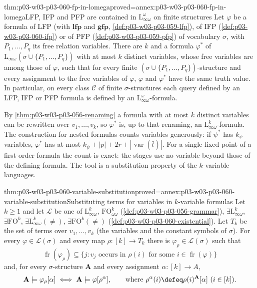 \begin{hbtheorem}{thm:p03-w03-p03-060-fp-in-lomega}{proved=annex:p03-w03-p03-060-fp-in-lomega}{LFP, IFP and PFP are contained in \(\mathrm{L}^\omega_{\infty\omega}\) on finite structures}
Let \(\varphi\) be a formula of LFP (with \(\mathbf{lfp}\) and
\(\mathbf{gfp}\), \cref{def:p03-w03-p03-059-lfp}), of IFP
(\cref{def:p03-w03-p03-060-ifp}) or of PFP (\cref{def:p03-w03-p03-059-pfp})
of vocabulary \(\sigma\), with \(P_1,\ldots,P_q\) its free relation
variables. There are \(k\) and a formula \(\varphi^\ast\) of
\(\mathrm{L}_{\infty\omega}(\sigma\cup\{P_1,\ldots,P_q\})\) with at most
\(k\) distinct variables, whose free variables are among those of
\(\varphi\), such that for every finite
\((\sigma\cup\{P_1,\ldots,P_q\})\)-structure and every assignment to the
free variables of \(\varphi\), \(\varphi\) and \(\varphi^\ast\) have the
same truth value. In particular, on every class \(\mathcal C\) of finite
\(\sigma\)-structures each query defined by an LFP, IFP or PFP formula is
defined by an \(\mathrm{L}^\omega_{\infty\omega}\)-formula.
\end{hbtheorem}

By \cref{thm:p03-w03-p03-056-renaming} a formula with at most \(k\) distinct
variables can be rewritten over \(v_1,\ldots,v_k\), so \(\varphi^\ast\) is,
up to that renaming, an \(\mathrm{L}^k_{\infty\omega}\)-formula. The
construction for nested formulas counts variables generously: if
\(\psi^\ast\) has \(k_\psi\) variables, \(\varphi^\ast\) has at most
\(k_\psi+|\bar p|+2r+|\operatorname{var}(\bar t)|\). For a single fixed
point of a first-order formula the count is exact: the stages use no
variable beyond those of the defining formula. The tool is a substitution
property of the \(k\)-variable languages.

\begin{hblemma}{thm:p03-w03-p03-060-variable-substitution}{proved=annex:p03-w03-p03-060-variable-substitution}{Substituting terms for variables in \(k\)-variable formulas}
Let \(k\ge1\) and let \(\mathcal L\) be one of
\(\mathrm{L}^k_{\infty\omega}\), \(\mathrm{FO}^k_{\omega\omega}\)
(\cref{def:p03-w03-p03-056-grammar}), \(\exists\mathrm{L}^k_{\infty\omega}\),
\(\exists\mathrm{FO}^k\), \(\exists\mathrm{L}^k_{\infty\omega}(\neq)\),
\(\exists\mathrm{FO}^k(\neq)\) (\cref{def:p03-w03-p03-060-existential}).
Let \(T_k\) be the set of terms over \(v_1,\ldots,v_k\) (the variables and
the constant symbols of \(\sigma\)). For every \(\varphi\in\mathcal L(\sigma)\)
and every map \(\rho\colon[k]\to T_k\) there is
\(\varphi_\rho\in\mathcal L(\sigma)\) such that
\[
 \operatorname{fr}(\varphi_\rho)\subseteq\{j:v_j\text{ occurs in }\rho(i)\text{ for some }i\in\operatorname{fr}(\varphi)\}
\]
and, for every \(\sigma\)-structure \(\mathbf A\) and every assignment
\(\alpha\colon[k]\to A\),
\[
 \mathbf A\models\varphi_\rho[\alpha]\iff\mathbf A\models\varphi[\rho^\alpha],
 \qquad\text{where }\rho^\alpha(i)\defeq\rho(i)^{\mathbf A}[\alpha]\ (i\in[k]).
\]
\end{hblemma}

